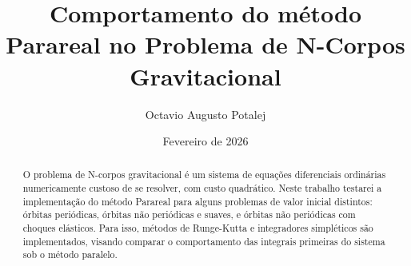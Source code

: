 \documentclass{article}
\title{Comportamento do método Parareal no Problema de N-Corpos Gravitacional}
\author{Octavio Augusto Potalej}
\date{Fevereiro de 2026}
\begin{document}
\maketitle

\begin{abstract}
O problema de N-corpos gravitacional é um sistema de equações diferenciais ordinárias numericamente custoso de se resolver, com custo quadrático. Neste trabalho testarei a implementação do método Parareal para alguns problemas de valor inicial distintos: órbitas periódicas, órbitas não periódicas e suaves, e órbitas não periódicas com choques elásticos. Para isso, métodos de Runge-Kutta e integradores simpléticos são implementados, visando comparar o comportamento das integrais primeiras do sistema sob o método paralelo.
\end{abstract}

\tableofcontents
\pagebreak







\printbibliography
\end{document}
